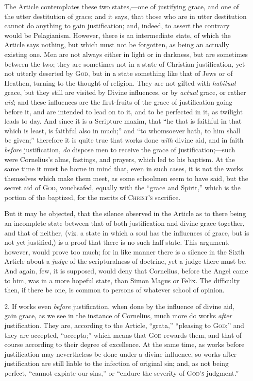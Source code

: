 The Article contemplates these two states,—one of justifying
grace, and one of the utter destitution of grace; and it says, that
those who are in utter destitution cannot do anything to gain
justification; and, indeed, to assert the contrary would be
Pelagianism. However, there is an intermediate state, of which the
Article says nothing, but which must not be forgotten, as being an
actually existing one. Men are not always either in light or in
darkness, but are sometimes between the two; they are sometimes not in
a state of Christian justification, yet not utterly deserted by G\textsc{od},
but in a state something like that of Jews or of Heathen, turning to
the thought of religion. They are not gifted with \emph{habitual}
grace, but they still are visited by Divine influences, or by \emph{actual}
grace, or rather \emph{aid}; and these influences are the first-fruits
of the grace of justification going before it, and are intended to
lead on to it, and to be perfected in it, as twilight leads to day.
And since it is a Scripture maxim, that ``he that is faithful in
that which is least, is faithful also in much;'' and ``to
whomsoever hath, to him shall be given;'' therefore it is quite
true that works done \emph{with} divine aid, and in faith \emph{before}
justification, \emph{do} dispose men to receive the grace of
justification;—such were Cornelius's alms, fastings, and prayers,
which led to his baptism. At the same time it must be borne in mind
that, even in such cases, it is not the works themselves which make
them meet, as some schoolmen seem to have said, but the secret aid of
G\textsc{od}, vouchsafed, equally with the ``grace
and Spirit,'' which is the portion of the baptized, for the merits
of C\textsc{hrist's} sacrifice.

But it may be objected, that the silence observed in the Article as
to there being an incomplete state between that of both justification
and divine grace together, and that of neither, (viz. a state in which
a soul has the influences of grace, but is not yet justified,) is a
proof that there is no such half state. This argument, however,
would prove too much; for in like manner there is a silence in the
Sixth Article about a \emph{judge} of the scripturalness of doctrine,
yet a judge there must be. And again, few, it is supposed, would deny
that Cornelius, before the Angel came to him, was in a more hopeful
state, than Simon Magus or Felix. The difficulty then, if there be
one, is common to persons of whatever school of opinion.

2. If works even \emph{before} justification, when done by the
influence of divine aid, gain grace, as we see in the instance of
Cornelius, much more do works \emph{after} justification. They are,
according to the Article, ``grata,'' ``pleasing to G\textsc{od};''
and they are accepted, ``accepta;'' which means that G\textsc{od}
rewards them, and that of course according to their degree of
excellence. At the same time, as works before justification may
nevertheless be done under a divine influence, so works after
justification are still liable to the infection of original sin; and,
as not being perfect, ``cannot expiate our sins,'' or
``endure the severity of G\textsc{od's}
judgment.''

